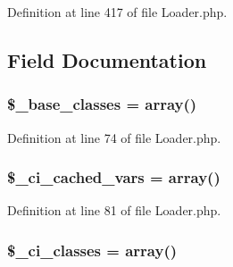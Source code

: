 Definition at line 417 of file Loader.\-php.



\subsection{Field Documentation}
\hypertarget{class_c_i___loader_a3f6ad72a17d4acd515c8cc224b94297e}{
\subsubsection[{\$\-\_\-base\-\_\-classes}]{\setlength{\rightskip}{0pt plus 5cm}\$\-\_\-base\-\_\-classes = array()\hspace{0.3cm}{\ttfamily [protected]}}}\label{class_c_i___loader_a3f6ad72a17d4acd515c8cc224b94297e}


Definition at line 74 of file Loader.\-php.

\hypertarget{class_c_i___loader_a963cdc111da481606d2d67adf4c2947f}{
\subsubsection[{\$\-\_\-ci\-\_\-cached\-\_\-vars}]{\setlength{\rightskip}{0pt plus 5cm}\$\-\_\-ci\-\_\-cached\-\_\-vars = array()\hspace{0.3cm}{\ttfamily [protected]}}}\label{class_c_i___loader_a963cdc111da481606d2d67adf4c2947f}


Definition at line 81 of file Loader.\-php.

\hypertarget{class_c_i___loader_adad50876041bed7c7bf44aac03eb1162}{
\subsubsection[{\$\-\_\-ci\-\_\-classes}]{\setlength{\rightskip}{0pt plus 5cm}\$\-\_\-ci\-\_\-classes = array()\hspace{0.3cm}{\ttfamily [protected]}}}\label{class_c_i___loader_adad50876041bed7c7bf44aac03eb1162}



